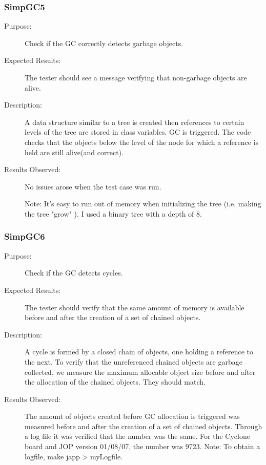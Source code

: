 \subsubsection{SimpGC5}

\begin{description}
    \item[Purpose:]
Check if the GC correctly detects garbage objects.
    \item[Expected Results:]
The tester should see a message verifying that non-garbage objects
are alive.
    \item[Description:]
A data structure similar to a tree is created then references to
certain levels of the tree are stored in class variables. GC is
triggered. The code checks that the objects below the level of the
node for which a reference is held are still alive(and correct).
    \item[Results Observed:]
No issues arose when the test case was run.

Note: It's easy to run out of memory when initializing the tree
(i.e. making the tree "grow" ). I used a binary tree with a depth of
8.

\end{description}

\subsubsection{SimpGC6}

\begin{description}
    \item[Purpose:]
Check if the GC detects cycles.
    \item[Expected Results:]
The tester should verify that the same amount of memory is available
before and after the creation of a set of chained objects.
    \item[Description:]
A cycle is formed by a closed chain of objects, one holding a
reference to the next. To verify that the unreferenced chained
objects are garbage collected, we measure the maximum allocable
object size before and after the allocation of the chained objects.
They should match.
    \item[Results Observed:]
The amount of objects created before GC allocation is triggered was
measured before and after the creation of a set of chained objects.
Through a log file it was verified that the number was the same. For
the Cyclone board and JOP version 01/08/07, the number was 9723.
Note: To obtain a logfile, make japp > myLogfile.
\end{description}


